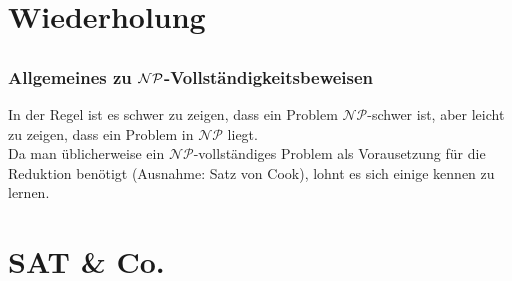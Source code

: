 

\section{Wiederholung}
\subsection{}

\begin{frame}
\frametitle{Allgemeines zu $\mathcal{NP}$-Vollständigkeitsbeweisen}
In der Regel ist es schwer zu zeigen, dass ein Problem $\mathcal{NP}$-schwer ist, aber leicht zu zeigen, dass ein Problem in $\mathcal{NP}$ liegt.\\[8pt]
Da man üblicherweise ein $\mathcal{NP}$-vollständiges Problem als Vorausetzung für die Reduktion benötigt (Ausnahme: Satz von Cook), lohnt es sich einige kennen zu lernen.
\end{frame}

\section{SAT \& Co.}
\subsection{}


